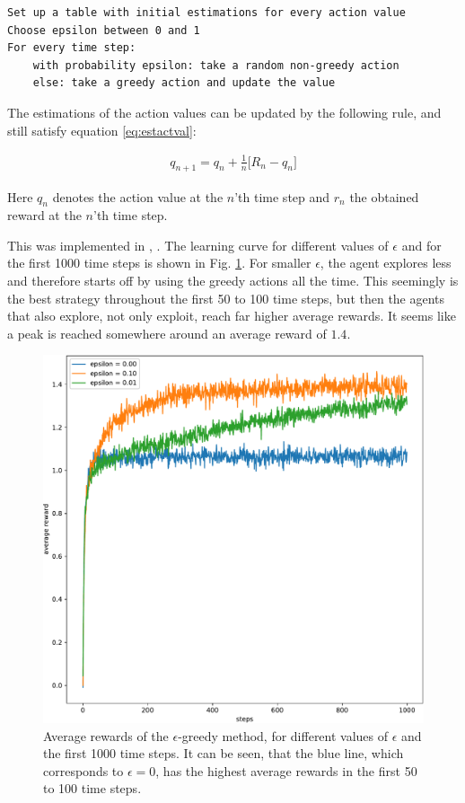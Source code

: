 \documentclass[paper=a4, fontsize=11pt]{scrartcl} %
\numberwithin{equation}{section} %
\numberwithin{figure}{section} %
\numberwithin{table}{section} %
\begin{document}
\begin{lstlisting}
Set up a table with initial estimations for every action value
Choose epsilon between 0 and 1
For every time step:
	with probability epsilon: take a random non-greedy action
	else: take a greedy action and update the value
\end{lstlisting}

	The estimations of the action values can be updated by the following rule, and still satisfy equation \ref{eq:estactval}:	
	
\begin{align}
 q_{n+1} = q_n + \frac{1}{n} \big[ R_n - q_n \big] 
\end{align}

	Here $q_n$ denotes the action value at the $n$'th time step and $r_n$ the obtained reward at the $n$'th time step. 

	This was implemented in \cite{SuttonBarto}, \cite{ShangtongZhang}. The learning curve for different values of $\epsilon$ and for the first 1000 time steps is shown in Fig. \ref{fig:epsilongreedy}. For smaller $\epsilon$, the agent explores less and therefore starts off by using the greedy actions all the time. This seemingly is the best strategy throughout the first 50 to 100 time steps, but then the agents that also explore, not only exploit, reach far higher average rewards. It seems like a peak is reached somewhere around an average reward of $1.4$. 

\begin{figure}[H]
\centering
\includegraphics[width=0.6\linewidth]{Images/figure_2_2_a-crop.pdf}
\caption{\cite{ShangtongZhang} Average rewards of the $\epsilon$-greedy method, for different values of $\epsilon$ and the first 1000 time steps. It can be seen, that the blue line, which corresponds to $\epsilon = 0$, has the highest average rewards in the first 50 to 100 time steps.}
\label{fig:epsilongreedy}
\end{figure}
\end{document}
